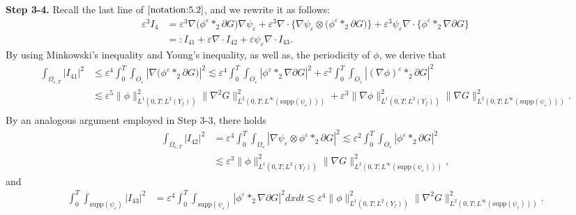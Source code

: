 \documentclass[13pt,CJK]{article}
\theoremstyle{plain}                       %
\theoremstyle{remark}
\numberwithin{equation}{section}
\begin{document}
\textbf{Step 3-4.} Recall the last line of $\eqref{notation:5.2}$, and
we rewrite it as follows:
\begin{equation*}
\begin{aligned}
\varepsilon^3 I_4
&=
\varepsilon^3\nabla
\big(\phi^{\varepsilon}\ast_2\partial G\big)\nabla\psi_{\varepsilon}
+\varepsilon^3
\nabla\cdot\bigg\{
\nabla\psi_{\varepsilon}\otimes
\big(\phi^{\varepsilon}\ast_2\partial G\big)
\bigg\}
+\varepsilon^3\psi_{\varepsilon}
\nabla\cdot\bigg\{\phi^{\varepsilon}\ast_2\nabla\partial G\bigg\}\\
&=: I_{41}+\varepsilon \nabla\cdot I_{42}+\varepsilon \psi_{\varepsilon}\nabla\cdot
I_{43}.
\end{aligned}
\end{equation*}
By using Minkowski's inequality and Young's inequality, as well as,
the periodicity of $\phi$, we derive that
\begin{equation*}
\begin{aligned}
\int_{\Omega_{\varepsilon,T}}|I_{41}|^2
&\leq\varepsilon^4
\int_{0}^{T}\int_{O_{\varepsilon}}|\nabla
\big(\phi^{\varepsilon}\ast_2\partial G\big)|^2
\lesssim\varepsilon^4
\int_{0}^{T}\int_{O_{\varepsilon}}|\phi^{\varepsilon}\ast_2\nabla\partial G|^2
+\varepsilon^2
\int_{0}^{T}\int_{O_{\varepsilon}}
|(\nabla\phi)^{\varepsilon}\ast_2\partial G|^2 \\
&\lesssim\varepsilon^5
\|\phi\|^2_{L^1(0,T;L^2(Y_f))}\|\nabla^2 G\|^2_{L^2(0,T;L^{\infty}
(\text{supp}(\psi_{\varepsilon})))}
+\varepsilon^3
\|\nabla\phi\|^2_{L^1(0,T;L^2(Y_f))}\|\nabla G\|^2_{L^2(0,T;L^{\infty}
(\text{supp}(\psi_{\varepsilon})))}.\\
\end{aligned}
\end{equation*}
By an analogous argument employed in Step 3-3, there holds
\begin{equation*}
\begin{aligned}
\int_{\Omega_{\varepsilon,T}}|I_{42}|^2
&=\varepsilon^4\int_{0}^{T}\int_{\Omega_{\varepsilon}}
|\nabla\psi_{\varepsilon}\otimes
\phi^{\varepsilon}\ast_2\partial G|^2
\lesssim\varepsilon^{2}\int_{0}^{T}\int_{O_{\varepsilon}}|
\phi^{\varepsilon}\ast_2\partial G|^2\\
&\lesssim\varepsilon^{3}
\|\phi\|^2_{L^1(0,T;L^2(Y_f))}\|\nabla G\|^2_{L^2(0,T;L^{\infty}
(\text{supp}(\psi_{\varepsilon})))},
\end{aligned}
\end{equation*}
and
\begin{equation*}
\begin{aligned}
\int_{0}^{T}\int_{\text{supp}(\psi_{\varepsilon})}|I_{43}|^2
&=\varepsilon^4\int_{0}^{T}\int_{\text{supp}(\psi_\varepsilon)}
|\phi^{\varepsilon}\ast_2\nabla\partial G|^2dxdt
\lesssim \varepsilon^4\|\phi\|^2_{L^1(0,T;L^2(Y_f))}\|\nabla^2 G\|^2_{L^2(0,T;L^{\infty}
(\text{supp}(\psi_{\varepsilon})))}.
\end{aligned}
\end{equation*}
\end{document}
